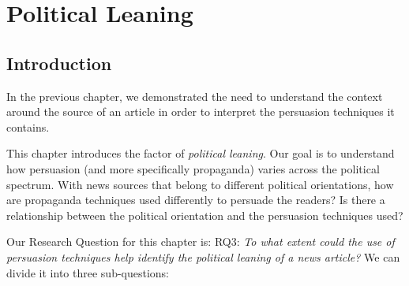 \chapter{\statusgreen Political Leaning}
\label{chap:political_sides}


% 

\section{\statusgreen Introduction}
\label{sec:ps_intro}


In the previous chapter, %
we demonstrated the need to understand the context around the source of an article in order to interpret the persuasion techniques it contains.

This chapter introduces the factor of \emph{political leaning}.
Our goal is to understand how persuasion (and more specifically propaganda) varies across the political spectrum.
With news sources that belong to different political orientations, how are propaganda techniques
used differently to persuade the readers?
Is there a relationship between the political orientation and the persuasion techniques used?


Our Research Question for this chapter is:
RQ3: \emph{To what extent could the use of persuasion techniques help identify the political leaning of a news article?} We can divide it into three sub-questions:

